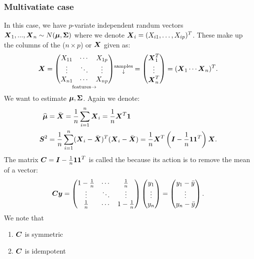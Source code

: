 \subsubsection{Multivatiate case}
In this case, we have $p$-variate independent randum vectors $\boldsymbol{X}_1,...,\boldsymbol{X}_n \sim N(\boldsymbol{\mu}, \boldsymbol{\Sigma})$ where we denote $\boldsymbol{X}_i=(X_{i1},\dots,X_{ip})^T$. These make up the columns of the ($n\times p$)  or  $\boldsymbol{X}$ given as:
$$
    \boldsymbol{X} = 
    \underset{\mathrm{features} \rightarrow}{
    \begin{pmatrix}
        X_{11} & \cdots & X_{1p} \\
        \vdots & \ddots & \vdots \\
        X_{n1} & \cdots & X_{np}
    \end{pmatrix}}
    \substack{\text{samples} \\ \downarrow}
    = \begin{pmatrix}
        \boldsymbol{X}_1^T \\ \vdots \\ \boldsymbol{X}_n^T
    \end{pmatrix}= (\boldsymbol{X}_1 \cdots \boldsymbol{X}_n)^T.
$$
We want to estimate $\boldsymbol{\mu}, \boldsymbol{\Sigma}$. Again we denote:
\begin{align*}
    \widehat{\boldsymbol{\mu}} &= \bar{\boldsymbol{X}} = \frac{1}{n} \sum_{i=1}^n \boldsymbol{X}_i = \frac{1}{n}\boldsymbol{X}^T \boldsymbol{1} \\
    \boldsymbol{S}^2 
    &= \frac{1}{n} \sum_{i=1}^n (\boldsymbol{X}_i-\bar{\boldsymbol{X}})^T(\boldsymbol{X}_i-\bar{\boldsymbol{X}}) 
    = \frac{1}{n} \boldsymbol{X}^T\left( \boldsymbol{I}-\frac{1}{n} \boldsymbol{1}\boldsymbol{1}^T \right)\boldsymbol{X}.
\end{align*}
The matrix $\boldsymbol{C}=\boldsymbol{I}-\frac{1}{n} \boldsymbol{1}\boldsymbol{1}^T$ is called the  because its action is to remove the mean of a vector:
$$
    \boldsymbol{C} \boldsymbol{y} = \begin{pmatrix}
        1-\frac{1}{n} & \cdots & \frac{1}{n} \\
        \vdots & \ddots & \vdots \\
        \frac{1}{n} & \cdots & 1-\frac{1}{n}
    \end{pmatrix}
    \begin{pmatrix}
        y_1 \\ \vdots \\ y_n
    \end{pmatrix}
    = 
    \begin{pmatrix}
        y_1-\bar{y} \\ \vdots \\ y_n-\bar{y}
    \end{pmatrix}.
$$
We note that 
\begin{enumerate}
    \item $\boldsymbol{C}$ is symmetric
    \item $\boldsymbol{C}$ is idempotent
\end{enumerate}

